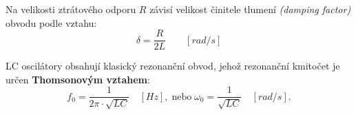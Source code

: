 {      Na velikosti ztrátového odporu \(R\) závisí velikost činitele tlumení \emph{(damping factor)} 
      obvodu podle vztahu:
      \begin{equation}\label{AES:eq_osc01}
        \delta = \frac{R}{2L} \qquad [rad/s]
      \end{equation}
      
      LC oscilátory obsahují klasický rezonanční obvod, jehož rezonanční kmitočet je určen 
      \textbf{Thomsonovým vztahem}:
      \begin{equation}\label{AES:eq_osc03}
        f_0 = \frac{1}{2\pi\cdot\sqrt{LC}} \quad [Hz], \;\text{nebo}\; 
        \omega_0 = \frac{1}{\sqrt{LC}} \quad [rad/s].
      \end{equation}
      
} %
\printbibliography[title={Seznam literatury}, heading=subbibliography]
